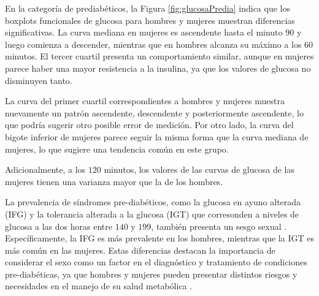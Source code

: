 En la categoría de prediabéticos, la Figura \ref{fig:glucosaPredia} indica que los boxplots funcionales de glucosa para hombres y mujeres muestran diferencias significativas. La curva mediana en mujeres es ascendente hasta el minuto $90$ y luego comienza a descender, mientras que en hombres alcanza su máximo a los $60$ minutos. El tercer cuartil presenta un comportamiento similar, aunque en mujeres parece haber una mayor resistencia a la insulina, ya que los valores de glucosa no disminuyen tanto.

La curva del primer cuartil correspondientes a hombres y mujeres muestra nuevamente un patrón ascendente, descendente y posteriormente ascendente, lo que podría sugerir otro posible error de medición. Por otro lado, la curva del bigote inferior de mujeres parece seguir la misma forma que la curva mediana de mujeres, lo que sugiere una tendencia común en este grupo.

Adicionalmente, a los $120$ minutos, los valores de las curvas de glucosa de las mujeres tienen una varianza mayor que la de los hombres. 

La prevalencia de síndromes pre-diabéticos, como la glucosa en ayuno alterada (IFG) y la tolerancia alterada a la glucosa (IGT) que corresonden a niveles de glucosa a las dos horas entre $140$ y $199$, también presenta un sesgo sexual \cite{GenderDifferences2018}. Específicamente, la IFG es más prevalente en los hombres, mientras que la IGT es más común en las mujeres. Estas diferencias destacan la importancia de considerar el sexo como un factor en el diagnóstico y tratamiento de condiciones pre-diabéticas, ya que hombres y mujeres pueden presentar distintos riesgos y necesidades en el manejo de su salud metabólica \cite{GenderDifferences2018}.

